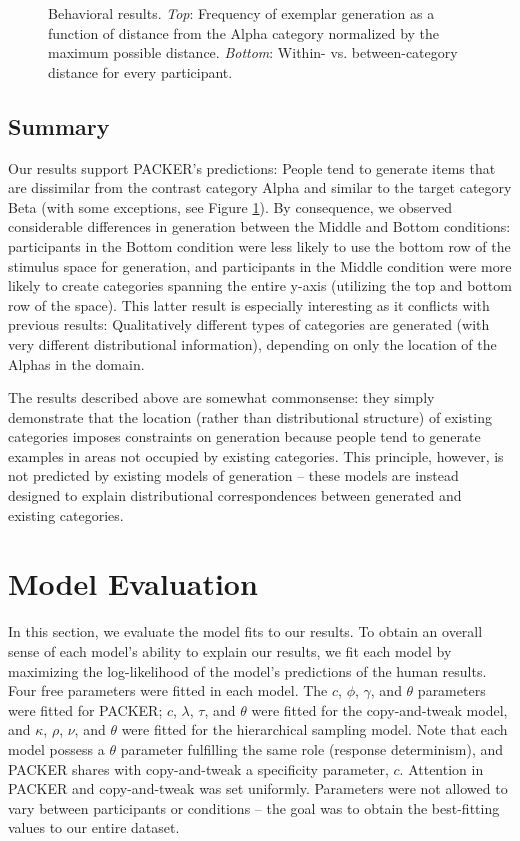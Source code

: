 \documentclass[10pt,letterpaper]{article}
\newcommand\inputpgf[2]{{
\let\pgfimageWithoutPath\pgfimage
\renewcommand{\pgfimage}[2][]{\pgfimageWithoutPath[##1]{#1/##2}}

}}
\begin{document}
\begin{figure}
    \begin{center}
    \inputpgf{figs/}{distance.figs.pgf}
    \caption{Behavioral results. \textit{Top}: Frequency of exemplar generation as a function of distance from the Alpha category normalized by the maximum possible distance. \textit{Bottom}: Within- vs. between-category distance for every participant. }
    \label{fig:distance.figs}
    \end{center}
\end{figure}


\subsection{Summary}
Our results support PACKER's predictions: People tend to generate items that are dissimilar from the contrast category Alpha and similar to the target category Beta (with some exceptions, see Figure \ref{fig:distance.figs}). By consequence, we observed considerable differences in generation between the Middle and Bottom conditions: participants in the Bottom condition were less likely to use the bottom row of the stimulus space for generation, and participants in the Middle condition were more likely to create categories spanning the entire y-axis (utilizing the top and bottom row of the space). This latter result is especially interesting as it conflicts with previous results: Qualitatively different types of categories are generated (with very different distributional information), depending on only the location of the Alphas in the domain. 

The results described above are somewhat commonsense: they simply demonstrate that the location (rather than distributional structure) of existing categories imposes constraints on generation because people tend to generate examples in areas not occupied by existing categories. This principle, however, is not predicted by existing models of generation -- these models are instead designed to explain distributional correspondences between generated and existing categories.  


\section{Model Evaluation}
In this section, we evaluate the model fits to our results. To obtain an overall sense of each model's ability to explain our results, we fit each model by maximizing the log-likelihood of the model's predictions of the human results. Four free parameters were fitted in each model. The $c$, $\phi$, $\gamma$, and $\theta$ parameters were fitted for PACKER; $c$, $\lambda$, $\tau$, and $\theta$ were fitted for the copy-and-tweak model, and $\kappa$, $\rho$, $\nu$, and $\theta$ were fitted for the hierarchical sampling model. Note that each model possess a $\theta$ parameter fulfilling the same role (response determinism), and PACKER shares with copy-and-tweak a specificity parameter, $c$. Attention in PACKER and copy-and-tweak was set uniformly. Parameters were not allowed to vary between participants or conditions -- the goal was to obtain the best-fitting values to our entire dataset.
\end{document}

